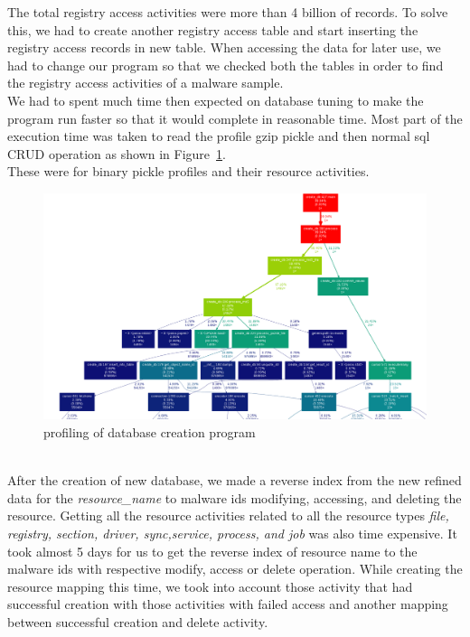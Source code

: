 The total registry access activities were more than 4 billion of records.
To solve this, we had to create another registry access table and start inserting the registry access records in new table.
When accessing the data for later use, we had to change our program so that we checked both the tables in order to find the registry access activities of a malware sample.\\
We had to spent much time then expected on database tuning to make the program run faster so that it would complete in reasonable time.
Most part of the execution time was taken to read the profile gzip pickle and then normal sql CRUD operation as shown in Figure~\ref{fig:dbcreation}.\\
These were for \gettotalmalwareii{} binary pickle profiles and their resource activities.
\begin{figure}
\begin{center}
  \includegraphics[scale=0.27]{figures/db_creation.png}
\end{center}
\caption{profiling of database creation program}
\label{fig:dbcreation}
\end{figure}
\\
After the creation of new database, we made a reverse index from the new refined data for the \emph{resource\_name} to malware ids modifying, accessing, and deleting the resource.
Getting all the resource activities related to all the resource types \emph{file, registry, section, driver, sync,service, process, and job} was also time expensive.
It took almost 5 days for us to get the reverse index of resource name to the malware ids with respective modify, access or delete operation.
While creating the resource mapping this time, we took into account those activity that had successful creation with those activities with failed access and another mapping between successful creation and delete activity.
